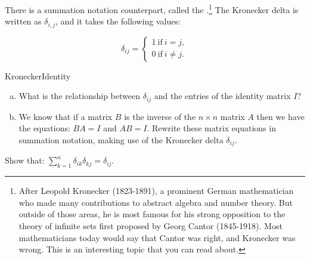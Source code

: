 There is a summation notation counterpart, called the .\footnote{After Leopold Kronecker (1823-1891), a prominent German mathematician who made many contributions to abstract algebra and number theory. But outside of those areas, he is most famous for his strong opposition to the theory of infinite sets first proposed by Georg Cantor (1845-1918).  Most mathematicians today would say that Cantor was right, and Kronecker was wrong. This is an interesting topic that you can read about.} The Kronecker delta is written as $\delta_{i,j}$, and it takes the following values:

\[ \delta_{ij}=
\begin{cases}
1 ~ \text{if} ~ i=j,  \\
0 ~ \text{if} ~ i \neq j.
\end{cases} \]

\begin{exercise}{KroneckerIdentity}
\begin{enumerate}[(a)]
\item
What is the relationship between $\delta_{ij}$ and  the entries of the identity matrix $I$?
\item
We know that if a matrix $B$ is the inverse of the $n \times n$ matrix $A$ then we have the equations: $BA = I$ and $AB = I$.  Rewrite these matrix equations in summation notation, making use of the Kronecker delta $\delta_{ij}$.
\end{enumerate}
\end{exercise}

\begin{exercise}{}
Show that: $\displaystyle{ \sum_{k=1}^n  \delta_{ik}\delta_{kj}=\delta_{ij}}.$
\end{exercise}

